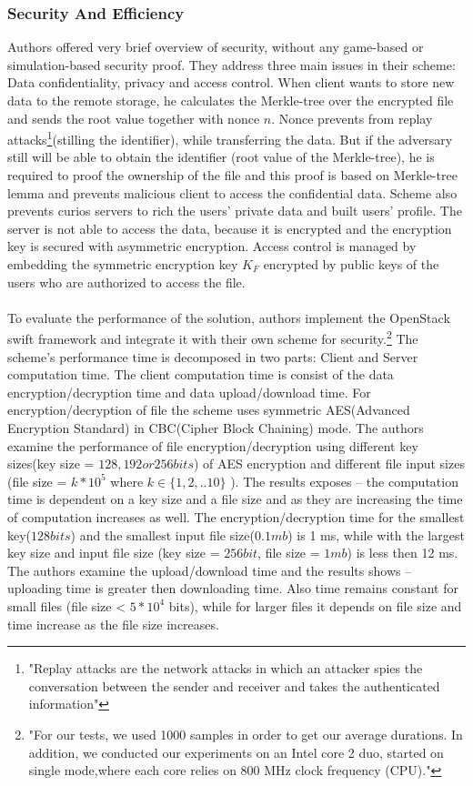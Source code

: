\documentclass[12pt]{article}
\begin{document}
\subsubsection{Security And Efficiency}
\label{subsub:secAndeff5}
Authors offered very brief overview of security, without any game-based or simulation-based security proof. They address three main issues in their scheme: Data confidentiality, privacy and access control.  When client wants to store new data to the remote storage, he calculates the Merkle-tree  over the encrypted file and sends the root value together with nonce $n$. Nonce  prevents from replay attacks\footnote{"Replay attacks are the network attacks in which an attacker spies the conversation between the sender and receiver and takes the authenticated information"}(stilling the identifier), while transferring the data. But if the adversary still will be able to obtain the identifier (root value of the Merkle-tree), he is required to proof the ownership of the file and this proof is based on Merkle-tree lemma \cite{MerkleLemma} and prevents malicious client to access the confidential data. Scheme also prevents curios  servers to rich  the users' private data and built users' profile. The server is not able to access the data, because it is encrypted and the encryption key is secured with asymmetric encryption. Access control is managed by embedding the symmetric encryption key $K_F$ encrypted by public keys of the users who are authorized to access the file.\\\\
To evaluate the performance of the solution, authors implement the OpenStack swift framework and integrate it with their own scheme for security.\footnote{"For our tests, we used 1000 samples in order to get our average durations. In addition, we conducted our experiments on an Intel core 2 duo, started on single mode,where each core relies on 800 MHz clock frequency (CPU).\cite{CovergentEnc}"} The scheme's performance time is decomposed in two parts: Client and Server computation time. The client computation time is consist of the data encryption/decryption time and data upload/download time. For encryption/decryption of file the scheme uses symmetric AES(Advanced Encryption Standard) in CBC(Cipher Block Chaining) mode.
The authors examine the performance of file encryption/decryption using different key sizes(key size = $128, 192 or 256 bits$) of AES encryption and different file input sizes (file size = $k * 10^5$ where $k \in \{ 1,2,..10\}$ ).  The results  exposes -- the computation time is dependent on a key size and a file size and as they are increasing the time of computation increases as well. The encryption/decryption time for the smallest key($128 bits$) and the smallest input file size($0.1 mb$) is 1 ms, while with the largest key size and input file size (key size = $256 bit$, file size = $1mb$) is less then 12 ms.  The authors examine the upload/download time and the results shows -- uploading time is greater then downloading time. Also time remains constant for small files (file size < $5*10^4$ bits), while for  larger files it depends on file size and time increase as the file size increases.
\end{document}
